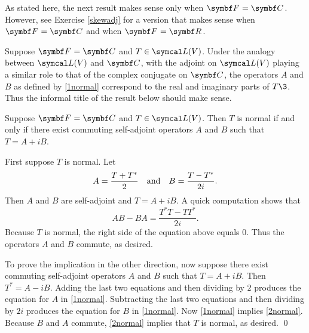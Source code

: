 As stated here, the next result makes sense only when $\F{} = \C{}$. However, see Exercise \ref{skewadj} for a version that makes sense when $\F{} = \C{}$ and when $\F{} = \R{}$.

Suppose $\F{} = \C{}$ and $T \in \L(V)$. Under the analogy between $\L(V)$ and $\C{}$, with the adjoint on $\L(V)$ playing a similar role to that of the complex conjugate on $\C{}$, the operators $A$ and $B$ as defined by \ref{1normal} correspond to the real and imaginary parts of $T\3$. Thus the informal title of the result below should make sense.

{Suppose $\F{} = \C{}$ and $T \in \L(V)$. Then $T$ is normal if and only if there exist commuting self-adjoint operators $A$ and $B$ such that $T = A + iB$.}

\proof
First suppose $T$ is normal. Let
\begin{equation} \label{1normal}
A = \frac{T + T^*}{2} \andd B = \frac{T - T^*}{2i}.
\end{equation}%
Then $A$ and $B$ are self-adjoint and $T = A + iB$. A quick computation shows that
\begin{equation} \label{2normal}
AB - BA = \frac{T^*T - TT^*}{2i}.
\end{equation}%
Because $T$ is normal, the right side of the equation above equals $0$. Thus the operators $A$ and $B$ commute, as desired.

To prove the implication in the other direction, now suppose there exist commuting self-adjoint operators $A$ and $B$ such that
$T = A + iB$. Then \mbox{$T^* = A - iB$}. Adding the last two equations and then dividing by $2$ produces the equation for $A$ in \ref{1normal}. Subtracting the last two equations and then dividing by $2i$ produces the equation for $B$ in \ref{1normal}. Now \ref{1normal} implies \ref{2normal}. Because $B$ and $A$ commute, \ref{2normal} implies that $T$ is normal, as desired.
\qed

